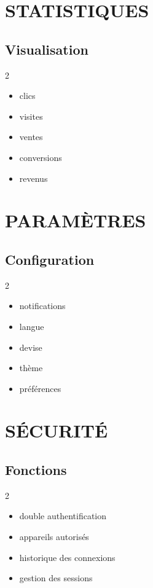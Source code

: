 \documentclass[12pt,a4paper,oneside]{book}
\begin{document}
\chapter{STATISTIQUES}

\section{Visualisation}
\begin{multicols}{2}
\begin{itemize}
\item clics
\item visites
\item ventes
\item conversions
\item revenus
\end{itemize}
\end{multicols}

\chapter{PARAMÈTRES}

\section{Configuration}
\begin{multicols}{2}
\begin{itemize}
\item notifications
\item langue
\item devise
\item thème
\item préférences
\end{itemize}
\end{multicols}

\chapter{SÉCURITÉ}

\section{Fonctions}
\begin{multicols}{2}
\begin{itemize}
\item double authentification
\item appareils autorisés
\item historique des connexions
\item gestion des sessions
\end{itemize}
\end{multicols}
\end{document}
